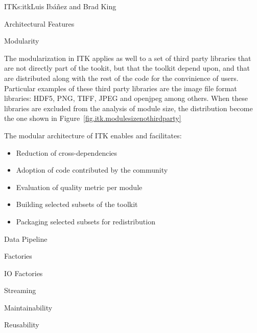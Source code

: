 \begin{aosachapter}{ITK}{s:itk}{Luis Ib\'{a}\~{n}ez and Brad King}
\begin{aosasect1}{Architectural Features}
\begin{aosasect2}{Modularity}

The modularization in ITK applies as well to a set of third party libraries
that are not directly part of the tookit, but that the toolkit depend upon, and
that are distributed along with the rest of the code for the convinience of
users. Particular examples of these third party libraries are the image file
format libraries: HDF5, PNG, TIFF, JPEG and openjpeg among others. When these
libraries are excluded from the analysis of module size, the distribution
become the one shown in Figure~\ref{fig.itk.modulesizenothirdparty}


The modular architecture of ITK enables and facilitates:

\begin{itemize}
\item Reduction of cross-dependencies
\item Adoption of code contributed by the community
\item Evaluation of quality metric per module
\item Building selected subsets of the toolkit
\item Packaging selected subsets for redistribution
\end{itemize}
\end{aosasect2}

\begin{aosasect2}{Data Pipeline}
\end{aosasect2}

\begin{aosasect2}{Factories}
\end{aosasect2}

\begin{aosasect2}{IO Factories}
\end{aosasect2}

\begin{aosasect2}{Streaming}
\end{aosasect2}

\begin{aosasect2}{Maintainability}
\end{aosasect2}

\begin{aosasect2}{Reusability}
\end{aosasect2}


\end{aosasect1}
\end{aosachapter}
